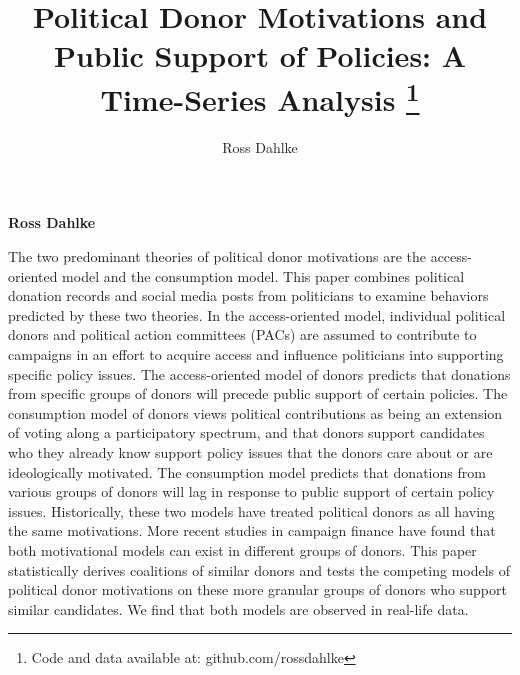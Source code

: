 \documentclass[12pt,]{article}
\title{Political Donor Motivations and Public Support of Policies: A
Time-Series Analysis \thanks{Code and data available at: github.com/rossdahlke}  }
\author{\Large Ross Dahlke\vspace{0.05in} \newline\normalsize\emph{}  }
\date{}
\newcommand*{\authorfont}{\fontfamily{phv}\selectfont}
\renewenvironment{abstract}
 {{%
    \setlength{\leftmargin}{0mm}
    \setlength{\rightmargin}{\leftmargin}%
  }%
  \relax}
 {\endlist}
\begin{document}
	
%

{%
\setlength{\parindent}{0pt}
\thispagestyle{plain}
{\fontsize{18}{20}\selectfont\raggedright 
\maketitle  %

}

{
   \vskip 13.5pt\relax \normalsize\fontsize{11}{12} 
\textbf{\authorfont Ross Dahlke} \hskip 15pt \emph{\small }   

}

}








\begin{abstract}

    \hbox{\vrule height .2pt width 39.14pc}

    \vskip 8.5pt %

\noindent The two predominant theories of political donor motivations are the
access-oriented model and the consumption model. This paper combines
political donation records and social media posts from politicians to
examine behaviors predicted by these two theories. In the
access-oriented model, individual political donors and political action
committees (PACs) are assumed to contribute to campaigns in an effort to
acquire access and influence politicians into supporting specific policy
issues. The access-oriented model of donors predicts that donations from
specific groups of donors will precede public support of certain
policies. The consumption model of donors views political contributions
as being an extension of voting along a participatory spectrum, and that
donors support candidates who they already know support policy issues
that the donors care about or are ideologically motivated. The
consumption model predicts that donations from various groups of donors
will lag in response to public support of certain policy issues.
Historically, these two models have treated political donors as all
having the same motivations. More recent studies in campaign finance
have found that both motivational models can exist in different groups
of donors. This paper statistically derives coalitions of similar donors
and tests the competing models of political donor motivations on these
more granular groups of donors who support similar candidates. We find
that both models are observed in real-life data.


    \hbox{\vrule height .2pt width 39.14pc}


\end{abstract}
\end{document}
